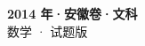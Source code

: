 \documentclass[zihao=-4, a4paper]{ctexart}
\begin{document}
\begin{center}
  {\Large\bfseries 2014 年·安徽卷·文科}\\[4pt]
  {\large 数学 · 试题版}
\end{center}
\medskip
{}

\end{document}
